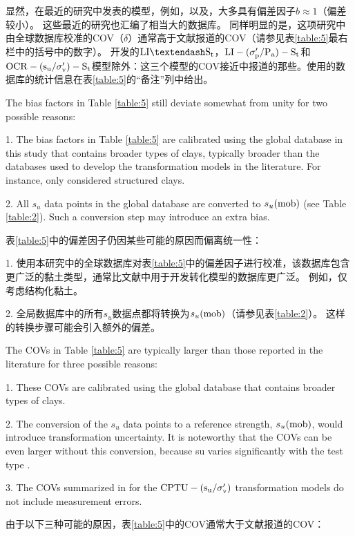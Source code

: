 \begin{Parallel}{0.60\textwidth}{}
{    }
    \ParallelRText
    {
        显然，在最近的研究中发表的模型，例如\citet{Kulhawy1990}，\citet{Chen1996488}以及\citet{Ching201252, Ching2012522}，大多具有偏差因子$b\approx{}1$（偏差较小）。 这些最近的研究也汇编了相当大的数据库。 同样明显的是，这项研究中由全球数据库校准的COV（$\delta$）通常高于文献报道的COV（请参见表\ref{table:5}最右栏中的括号中的数字）。 \citet{Ching2012522}开发的$\rm{LI}–S_t$，$\rm{LI}-(\sigma_p'/P_a)-S_t$和$\rm{OCR}-(s_u/\sigma_v')-S_t$模型除外：这三个模型的COV接近\citet{Ching2012522}中报道的那些。\citet{Ching2012522}使用的数据库的统计信息在表\ref{table:5}的“备注”列中给出。
    }
    \ParallelPar
    \ParallelLText
    {
        The bias factors in Table \ref{table:5} still deviate somewhat from unity for two possible reasons:

        1. The bias factors in Table \ref{table:5} are calibrated using the global database in this study that contains broader types of clays, typically broader than the databases used to develop the transformation models in the literature. For instance, \citet{Ching2012522} only considered structured clays.

        2. All $s_u$ data points in the global database are converted to $s_u(\rm{mob})$ (see Table \ref{table:2}). Such a conversion step may introduce an extra bias.
    }
    \ParallelRText
    {
        表\ref{table:5}中的偏差因子仍因某些可能的原因而偏离统一性：

        1. 使用本研究中的全球数据库对表\ref{table:5}中的偏差因子进行校准，该数据库包含更广泛的黏土类型，通常比文献中用于开发转化模型的数据库更广泛。 例如，\citet{Ching2012522}仅考虑结构化黏土。
        
        2. 全局数据库中的所有$s_u$数据点都将转换为$s_u(\rm{mob})$（请参见表\ref{table:2}）。 这样的转换步骤可能会引入额外的偏差。
    }
    \ParallelPar
    \ParallelLText
    {
        The COVs in Table \ref{table:5} are typically larger than those reported in the literature for three possible reasons:

        1. These COVs are calibrated using the global database that contains broader types of clays.

        2. The conversion of the $s_u$ data points to a reference strength, $s_u(\rm{mob})$, would introduce transformation uncertainty. It is noteworthy that the COVs can be even larger without this conversion, because su varies significantly with the test type \citep{Ladd1977421}.
        
        3. The COVs summarized in \citet{Ching201252} for the $\rm{CPTU}-(s_u/\sigma_v')$ transformation models do not include measurement errors.
    }
    \ParallelRText
    {
        由于以下三种可能的原因，表\ref{table:5}中的COV通常大于文献报道的COV：

}
\end{Parallel}
